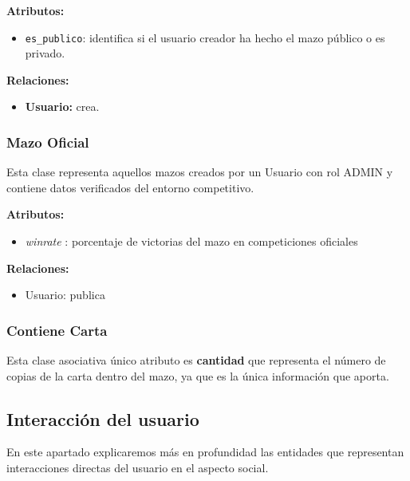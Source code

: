 \documentclass[10pt]{article}
\begin{document}
	\noindent %
	\begin{minipage}[c]{0.48\textwidth}
		\textbf{Atributos:}
		\begin{itemize}
			\item \texttt{es\_publico}: identifica si el usuario creador ha hecho el mazo público o es privado.
		\end{itemize}
	\end{minipage}
	\hfill %
	\begin{minipage}[c]{0.48\textwidth}
		\textbf{Relaciones:}
		\begin{itemize}
			\item \textbf{Usuario:} crea.
		\end{itemize}
	\end{minipage}
	
	\subsubsection{Mazo Oficial}
	
	Esta clase representa aquellos mazos creados por un Usuario con rol ADMIN y contiene datos verificados del entorno competitivo.\\
	\begin{minipage}[t]{0.48\textwidth}
		\textbf{Atributos:}
		\begin{itemize}
			\item \textit{winrate }: porcentaje de victorias del mazo en competiciones oficiales
		\end{itemize}
	\end{minipage}
	\hfill %
	\begin{minipage}[t]{0.48\textwidth}
		\textbf{Relaciones:}
		\begin{itemize}
			\item Usuario: publica
		\end{itemize}
	\end{minipage}
	
	
	\subsubsection{Contiene Carta}
	Esta clase  asociativa  único atributo es \textbf{cantidad } que representa el número de copias de la carta dentro del mazo, ya que es la única información que aporta.
	
	
	
	\subsection{Interacción del usuario}
	En este apartado explicaremos más en profundidad las entidades que representan interacciones directas del usuario en el aspecto social.
\end{document}
